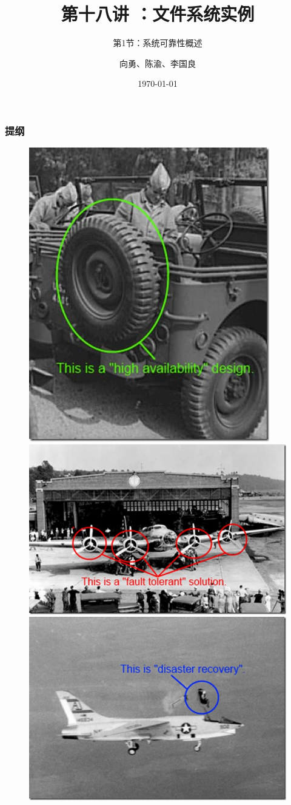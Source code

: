 


\title[第18讲]{第十八讲 ：文件系统实例} %
\subtitle{第1节：系统可靠性概述}
\author{向勇、陈渝、李国良} %
\date{\today} %



\begin{frame}
\titlepage %
\end{frame}

\begin{frame}
\frametitle{提纲} %
\tableofcontents %

\begin{figure}
\includegraphics[width=0.2\linewidth]{figs/ha.jpg}
\includegraphics[width=0.37\linewidth]{figs/ft.jpg}
\includegraphics[width=0.34\linewidth]{figs/dr.jpg}
\end{figure}
\end{frame}
